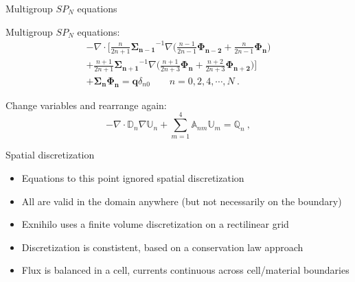 \documentclass{beamer}
\begin{document}
\begin{frame}{Multigroup $SP_N$ equations}
  
  Multigroup $SP_N$ equations:
  \begin{multline}
    -\nabla \cdot \Bigg[\frac{n}{2n+1}\mathbf{\Sigma_{n-1}}^{-1}
      \nabla \Big(\frac{n-1}{2n-1} \mathbf{\Phi_{n-2}} +
      \frac{n}{2n-1}\mathbf{\Phi_n} \Big) \\+
      \frac{n+1}{2n+1}\mathbf{\Sigma_{n+1}}^{-1} \nabla
      \Big(\frac{n+1}{2n+3}\mathbf{\Phi_n} +
      \frac{n+2}{2n+3}\mathbf{\Phi_{n+2}}\Big) \Bigg] \\+
    \mathbf{\Sigma_n} \mathbf{\Phi_n} = \mathbf{q}
    \delta_{n0}\ \ \ \ \ \ \ \ \ n = 0,2,4,\cdots,N\:.
    \label{eq:multigroup_spn_equations}
  \end{multline}

  Change variables and rearrange again:
  \begin{equation}
    -\nabla \cdot \mathbb{D}_n \nabla \mathbb{U}_n + \sum_{m=1}^4
    \mathbb{A}_{nm} \mathbb{U}_m = \mathbb{Q}_n\:,
    \label{eq:spn_multigroup_system}
  \end{equation}

\end{frame}

\begin{frame}{Spatial discretization}

  \begin{itemize}
    \item Equations to this point ignored spatial discretization
    \item All are valid in the domain anywhere (but not necessarily on
      the boundary)
    \item Exnihilo uses a finite volume discretization on a
      rectilinear grid
    \item Discretization is constistent, based on a conservation law
      approach
    \item Flux is balanced in a cell, currents continuous across
      cell/material boundaries
  \end{itemize}

\end{frame}
\end{document}
